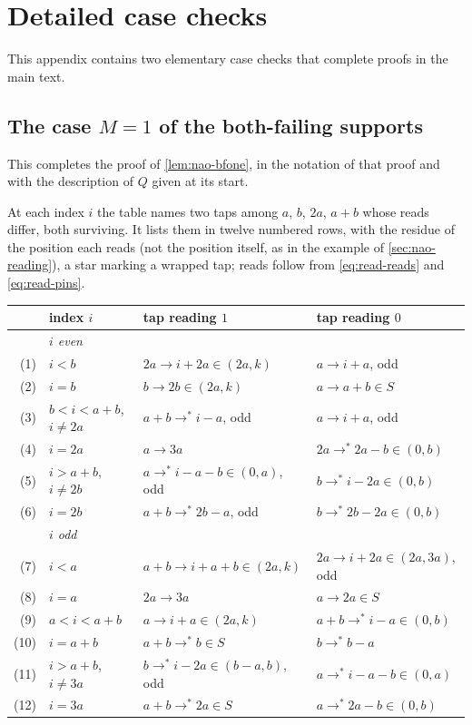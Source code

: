 \section{Detailed case checks}
\label{app:checks}

This appendix contains two elementary case checks that complete proofs in
the main text.

\subsection{The case \texorpdfstring{$M=1$}{M=1} of the both-failing supports}
\label{app:checks-bfone}

This completes the proof of \autoref{lem:nao-bfone}, in the notation of that
proof and with the description of $Q$ given at its start.

At each index $i$ the table names two taps among $a$, $b$, $2a$,
$a+b$ whose reads differ, both surviving. It lists them in twelve numbered
rows, with
the residue of the position each reads (not the position itself, as in the
example of \autoref{sec:nao-reading}), a star marking a wrapped tap; reads
follow from \eqref{eq:read-reads} and \eqref{eq:read-pins}.
\begin{center}\small
\begin{tabular}{rlll}
& index $i$ & tap reading $1$ & tap reading $0$\\\hline
& \multicolumn{3}{l}{\emph{$i$ even}}\\
(1) & $i<b$ & $2a\to i+2a\in(2a,k)$ & $a\to i+a$, odd\\
(2) & $i=b$ & $b\to 2b\in(2a,k)$ & $a\to a+b\in S$\\
(3) & $b<i<a+b$, $i\ne2a$ & $a+b\to^{*} i-a$, odd & $a\to i+a$, odd\\
(4) & $i=2a$ & $a\to 3a$ & $2a\to^{*} 2a-b\in(0,b)$\\
(5) & $i>a+b$, $i\ne2b$ & $a\to^{*} i-a-b\in(0,a)$, odd & $b\to^{*} i-2a\in(0,b)$\\
(6) & $i=2b$ & $a+b\to^{*} 2b-a$, odd & $b\to^{*} 2b-2a\in(0,b)$\\[2pt]
& \multicolumn{3}{l}{\emph{$i$ odd}}\\
(7) & $i<a$ & $a+b\to i+a+b\in(2a,k)$ & $2a\to i+2a\in(2a,3a)$, odd\\
(8) & $i=a$ & $2a\to 3a$ & $a\to 2a\in S$\\
(9) & $a<i<a+b$ & $a\to i+a\in(2a,k)$ & $a+b\to^{*} i-a\in(0,b)$\\
(10) & $i=a+b$ & $a+b\to^{*} b\in S$ & $b\to^{*} b-a$\\
(11) & $i>a+b$, $i\ne3a$ & $b\to^{*} i-2a\in(b-a,b)$, odd & $a\to^{*} i-a-b\in(0,a)$\\
(12) & $i=3a$ & $a+b\to^{*} 2a\in S$ & $a\to^{*} 2a-b\in(0,b)$
\end{tabular}
\end{center}
